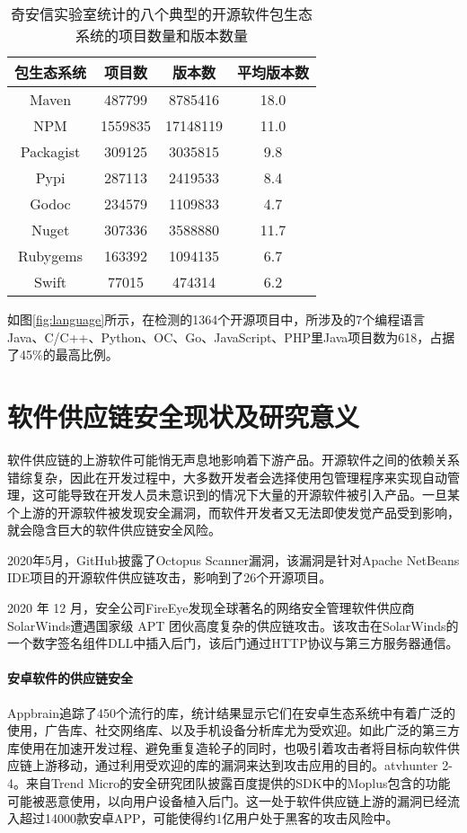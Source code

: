 \begin{table}[!hpt]
  \caption{奇安信实验室统计的八个典型的开源软件包生态系统的项目数量和版本数量}
  \label{tab:version}
  \centering
  \begin{tabular}{cccc} \toprule
    包生态系统 & 项目数 & 版本数 & 平均版本数 \\ \midrule
	Maven & 487799 & 8785416 & 18.0 \\
	NPM & 1559835 & 17148119 & 11.0 \\
	Packagist & 309125 & 3035815 & 9.8 \\
	Pypi & 287113 & 2419533 & 8.4 \\
	Godoc & 234579 & 1109833 & 4.7 \\
	Nuget & 307336 & 3588880 & 11.7 \\
	Rubygems & 163392 & 1094135 & 6.7 \\
	Swift & 77015 & 474314 & 6.2 \\ \bottomrule
  \end{tabular}
\end{table}

如图\ref{fig:language}所示，在检测的1364个开源项目中，所涉及的7个编程语言Java、C/C++、Python、OC、Go、JavaScript、PHP里Java项目数为618，占据了45\%的最高比例。




\section{软件供应链安全现状及研究意义}
软件供应链的上游软件可能悄无声息地影响着下游产品。开源软件之间的依赖关系错综复杂，因此在开发过程中，大多数开发者会选择使用包管理程序来实现自动管理，这可能导致在开发人员未意识到的情况下大量的开源软件被引入产品。一旦某个上游的开源软件被发现安全漏洞，而软件开发者又无法即使发觉产品受到影响，就会隐含巨大的软件供应链安全风险。

2020年5月，GitHub披露了Octopus Scanner漏洞\cite{octopus}，该漏洞是针对Apache NetBeans IDE项目的开源软件供应链攻击，影响到了26个开源项目。

2020 年 12 月，安全公司FireEye发现全球著名的网络安全管理软件供应商 SolarWinds遭遇国家级 APT 团伙高度复杂的供应链攻击。该攻击在SolarWinds的一个数字签名组件DLL中插入后门，该后门通过HTTP协议与第三方服务器通信。

\paragraph{安卓软件的供应链安全} Appbrain\cite{appbrain}追踪了450个流行的库，统计结果显示它们在安卓生态系统中有着广泛的使用，广告库、社交网络库、以及手机设备分析库尤为受欢迎。如此广泛的第三方库使用在加速开发过程、避免重复造轮子的同时，也吸引着攻击者将目标向软件供应链上游移动，通过利用受欢迎的库的漏洞来达到攻击应用的目的。atvhunter 2-4。来自Trend Micro的安全研究团队披露百度提供的SDK中的Moplus包含的功能可能被恶意使用，以向用户设备植入后门\cite{baidu}。这一处于软件供应链上游的漏洞已经流入超过14000款安卓APP，可能使得约1亿用户处于黑客的攻击风险中。

